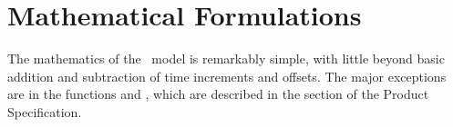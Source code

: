 %
%
% 
%

\section{Mathematical Formulations}


The mathematics of the \timeDesc\ model is remarkably simple, with little
beyond basic addition and subtraction of time increments and offsets. 
The major exceptions are in the functions
 and 
, which are
described in the  section of the Product
Specification.

